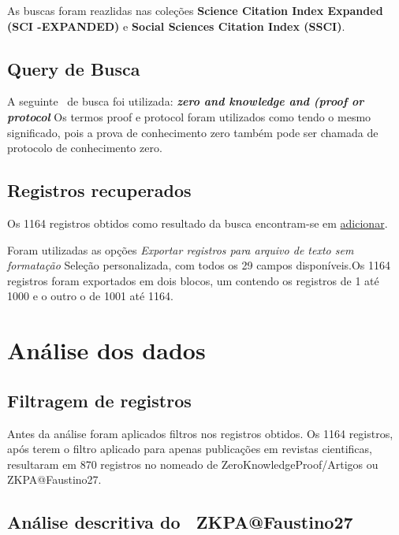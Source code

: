 As buscas foram reazlidas nas coleções \textbf{Science  Citation  Index  Expanded (SCI -EXPANDED)} e \textbf{Social  Sciences  Citation  Index (SSCI)}.

\subsection{Query de Busca}
A seguinte \querry\ de busca foi utilizada:
\textit{\textbf{zero and knowledge and (proof or protocol}}
Os termos proof e protocol foram utilizados como tendo o mesmo significado, pois a prova de conhecimento zero também pode ser chamada de protocolo de conhecimento zero.

\subsection{Registros recuperados}

Os 1164 registros obtidos como resultado da busca encontram-se em \url{adicionar}.

Foram utilizadas as opções \textit{Exportar registros para arquivo de texto sem formatação} Seleção personalizada, com todos os 29 campos disponíveis.Os 1164 registros foram exportados em dois blocos, um contendo os registros de 1 até 1000 e o outro o de 1001 até 1164.

\section{Análise dos dados}

\subsection{Filtragem de registros}

Antes da análise foram aplicados filtros nos registros obtidos. Os 1164 registros, após terem o filtro aplicado para apenas publicações em revistas cientificas, resultaram em 870 registros no \dataset nomeado de ZeroKnowledgeProof/Artigos ou ZKPA@Faustino27.

\subsection{Análise descritiva do \dataset\   ZKPA@Faustino27}

